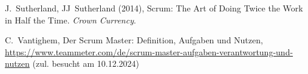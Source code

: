 \documentclass[5pt, final]{beamer}
\begin{document}
\begin{frame}[t]
\begin{multicols}{3}
\begin{thebibliography}{99}
                 J.~Sutherland, JJ~Sutherland (2014), Scrum: The Art of Doing Twice the Work in Half the Time. \textit{Crown Currency}.
                
                 C.~Vantighem, Der Scrum Master: Definition, Aufgaben und Nutzen, \url{https://www.teammeter.com/de/scrum-master-aufgaben-verantwortung-und-nutzen} (zul. besucht am 10.12.2024)            
 
                
               
				
			\end{thebibliography}
			
		\end{multicols}
		
	\end{frame}
\end{document}
